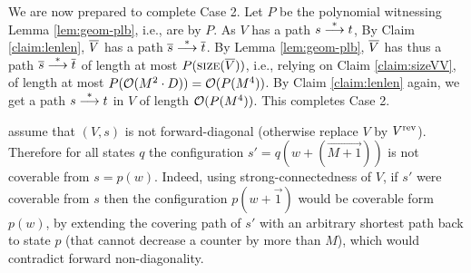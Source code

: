 We are now prepared to complete Case 2.
Let $P$ be the polynomial witnessing Lemma \ref{lem:geom-plb}, i.e.,
\geomvass are \lb by $P$.
As $V$ has a path $s\stackrel{*}{\longrightarrow} t$, 
By Claim \ref{claim:lenlen}, $\overline{V}$ has a path $\overline{s} \stackrel{*}{\longrightarrow} \overline{t}$.
By Lemma \ref{lem:geom-plb}, $\overline{V}$ has thus a path $\overline{s} \stackrel{*}{\longrightarrow} \overline{t}$
of length at most $P(\textsc{size}(\overline{V}))$, i.e., relying on Claim \ref{claim:sizeVV},
of length at most $P({\cal O}(M^2\cdot D)) = {\cal O}(P(M^{4}))$.
By Claim \ref{claim:lenlen} again, we get a path $s\stackrel{*}{\longrightarrow} t$ in $V$ of length
${\cal O}(P(M^{4}))$.
This completes Case 2.



\Wlog assume that $(V, s)$ is not forward-diagonal (otherwise replace $V$ by ${V}^{\text{rev}}$).
Therefore for all states $q$ the configuration $s'=q(w+(\vec{M{+}1}))$ is not
coverable from $s=p(w)$. 
Indeed, using strong-connectedness of $V$, if $s'$ were coverable from $s$ then
the configuration $p(w + \vec 1)$ would be coverable form $p(w)$, by 
extending the covering path of $s'$ with an arbitrary shortest path back to state $p$ 
(that cannot decrease a counter by more than $M$), which would contradict forward non-diagonality.

